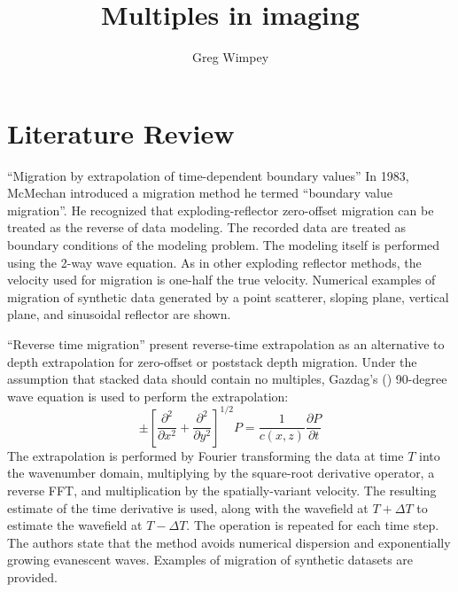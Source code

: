 \title{Multiples in imaging}
\author{Greg Wimpey}

\maketitle




\section{Literature Review}

``Migration by extrapolation of time-dependent boundary values'' In
1983, McMechan introduced a migration method he termed ``boundary
value migration''.  He recognized that exploding-reflector zero-offset
migration can be treated as the reverse of data modeling.  The
recorded data are treated as boundary conditions of the modeling
problem.  The modeling itself is performed using the 2-way wave
equation.  As in other exploding reflector methods, the velocity used
for migration is one-half the true velocity.  Numerical examples of
migration of synthetic data generated by a point scatterer, sloping
plane, vertical plane, and sinusoidal reflector are
shown. \citep{mcmechan83}

``Reverse time migration'' \citeauthor{baysaletal1983} present
reverse-time extrapolation as an alternative to depth extrapolation
for zero-offset or poststack depth migration.  Under the assumption
that stacked data should contain no multiples, Gazdag's
(\citeyear{gazdag81}) 90-degree wave equation is used to perform the
extrapolation:
\[\pm \left [ \frac{\partial^2}{\partial x^2} +
\frac{\partial^2}{\partial y^2} \right ]^{1/2} P = \frac{1}{c(x,z)}
\frac{\partial P}{\partial t}\] The extrapolation is performed by
Fourier transforming the data at time $T$ into the wavenumber domain,
multiplying by the square-root derivative operator, a reverse FFT, and
multiplication by the spatially-variant velocity. The resulting
estimate of the time derivative is used, along with the wavefield at
$T+ \Delta T$ to estimate the wavefield at $T- \Delta T$. The
operation is repeated for each time step. The authors state that the
method avoids numerical dispersion and exponentially growing
evanescent waves. Examples of migration of synthetic datasets are
provided.  \citep{baysaletal1983}

